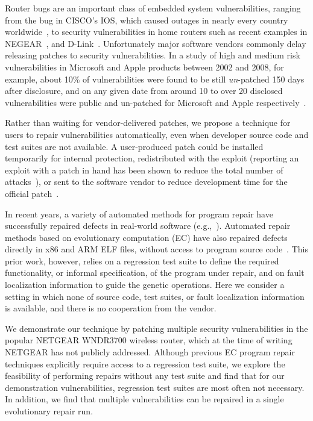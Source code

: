 \documentclass{sig-alternate}
\begin{document}
Router bugs are an important class of embedded system vulnerabilities,
ranging from the bug in CISCO's IOS, which caused outages in nearly
every country worldwide~\cite{biggest-router-bug}, to security
vulnerabilities in home routers such as recent examples in
NEGEAR~\cite{zcutlip}, and D-Link~\cite{d-link}.  Unfortunately major
software vendors commonly delay releasing patches to security
vulnerabilities.  In a study of high and medium risk vulnerabilities
in Microsoft and Apple products between 2002 and 2008, for example,
about 10\% of vulnerabilities were found to be still {\em un}-patched
150 days after disclosure, and on any given date from around 10 to
over 20 disclosed vulnerabilities were public and un-patched for
Microsoft and Apple respectively~\cite{frei20080}.

Rather than waiting for vendor-delivered patches, we propose a
technique for users to repair vulnerabilities automatically, even when
developer source code and test suites are not available.  A
user-produced patch could be installed temporarily for internal
protection, redistributed with the exploit (reporting an exploit with
a patch in hand has been shown to reduce the total number of
attacks~\cite{arora2006does}), or sent to the software vendor to
reduce development time for the official patch~\cite{weimer06}.

In recent years, a variety of automated methods for program repair
have successfully repaired defects in real-world software
(e.g.,~\cite{clearview,genprog-tse-journal,par,nguyen2013semfix}).
Automated repair methods based on evolutionary computation (EC) have
also repaired defects directly in x86 and ARM ELF files, without
access to program source code~\cite{SchulteEtAl2010a,schulte2013embedded}.  This prior
work, however, relies on a regression test suite to define the
required functionality, or informal specification, of the program
under repair, and on fault localization information to guide
the genetic operations.  Here we consider a setting in which none of
source code, test suites, or fault localization information is
available, and there is no cooperation from the vendor.

We demonstrate our technique by patching multiple security
vulnerabilities in the popular NETGEAR WNDR3700 wireless router, which
at the time of writing NETGEAR has not publicly addressed.  Although
previous EC program repair techniques explicitly require access to a
regression test suite, we explore the feasibility of performing
repairs without any test suite and find that for our demonstration
vulnerabilities, regression test suites are most often not
necessary. In addition, we find that multiple vulnerabilities can be
repaired in a single evolutionary repair run.
\end{document}

